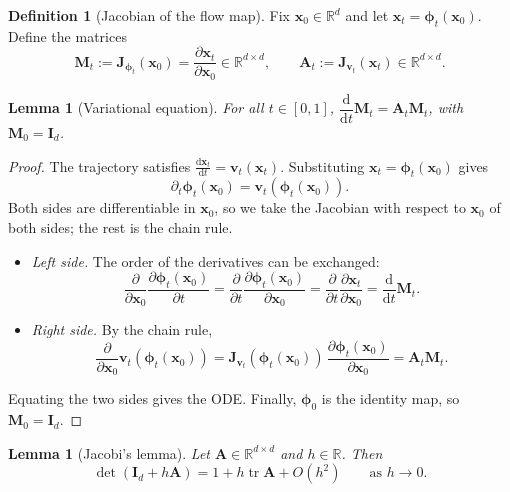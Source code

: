 \documentclass[11pt,a4paper]{article}
\numberwithin{equation}{section}     %
\theoremstyle{plain}        %
\newtheorem{lemma}[theorem]{Lemma}
\theoremstyle{definition}   %
\newtheorem{definition}[theorem]{Definition}
\theoremstyle{remark}       %
\begin{document}
\begin{definition}[Jacobian of the flow map]\label{def:Mt}
Fix $\mathbf{x}_0\in\mathbb{R}^d$ and let $\mathbf{x}_t=\boldsymbol{\phi}_t(\mathbf{x}_0)$. Define the matrices
\[
\mathbf{M}_t:=\mathbf{J}_{\boldsymbol{\phi}_t}(\mathbf{x}_0)=\frac{\partial\mathbf{x}_t}{\partial\mathbf{x}_0}\in\mathbb{R}^{d\times d},
\qquad
\mathbf{A}_t:=\mathbf{J}_{\mathbf{v}_t}(\mathbf{x}_t)\in\mathbb{R}^{d\times d}.
\]
\end{definition}

\begin{lemma}[Variational equation]\label{lem:variational}
For all $t\in[0,1]$, $\dfrac{\mathrm{d}}{\mathrm{d}t}\mathbf{M}_t=\mathbf{A}_t\mathbf{M}_t$, with $\mathbf{M}_0=\mathbf{I}_d$.
\end{lemma}

\begin{proof}
The trajectory satisfies $\frac{\mathrm{d}\mathbf{x}_t}{\mathrm{d}t}=\mathbf{v}_t(\mathbf{x}_t)$. Substituting $\mathbf{x}_t=\boldsymbol{\phi}_t(\mathbf{x}_0)$ gives
\[
\partial_t\boldsymbol{\phi}_t(\mathbf{x}_0)=\mathbf{v}_t(\boldsymbol{\phi}_t(\mathbf{x}_0)).
\]
Both sides are differentiable in $\mathbf{x}_0$, so we take the Jacobian with respect to $\mathbf{x}_0$ of both sides; the rest is the chain rule.
\begin{itemize}
\item \emph{Left side.} The order of the derivatives can be exchanged:
\[
\frac{\partial}{\partial\mathbf{x}_0}\frac{\partial\boldsymbol{\phi}_t(\mathbf{x}_0)}{\partial t}=\frac{\partial}{\partial t}\frac{\partial\boldsymbol{\phi}_t(\mathbf{x}_0)}{\partial\mathbf{x}_0}=\frac{\partial}{\partial t}\frac{\partial\mathbf{x}_t}{\partial\mathbf{x}_0}=\frac{\mathrm{d}}{\mathrm{d}t}\mathbf{M}_t .
\]
\item \emph{Right side.} By the chain rule,
\[
\frac{\partial}{\partial\mathbf{x}_0}\mathbf{v}_t(\boldsymbol{\phi}_t(\mathbf{x}_0))=\mathbf{J}_{\mathbf{v}_t}(\boldsymbol{\phi}_t(\mathbf{x}_0))\,\frac{\partial\boldsymbol{\phi}_t(\mathbf{x}_0)}{\partial\mathbf{x}_0}=\mathbf{A}_t\mathbf{M}_t .
\]
\end{itemize}
Equating the two sides gives the ODE. Finally, $\boldsymbol{\phi}_0$ is the identity map, so $\mathbf{M}_0=\mathbf{I}_d$.
\end{proof}

\begin{lemma}[Jacobi's lemma]\label{lem:jacobi}
Let $\mathbf{A}\in\mathbb{R}^{d\times d}$ and $h\in\mathbb{R}$. Then
\[
\det(\mathbf{I}_d+h\mathbf{A})=1+h\operatorname{tr}\mathbf{A}+O(h^2)\qquad\text{as }h\to0 .
\]
\end{lemma}
\end{document}

